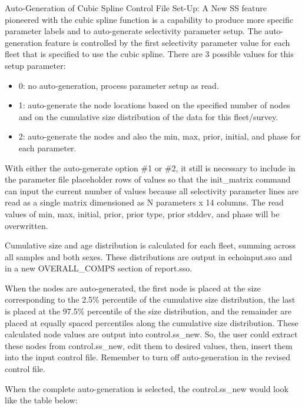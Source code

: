 	
Auto-Generation of Cubic Spline Control File Set-Up: A New SS feature pioneered with the cubic spline function is a capability to produce more specific parameter labels and to auto-generate selectivity parameter setup.  The auto-generation feature is controlled by the first selectivity parameter value for each fleet that is specified to use the cubic spline.  There are 3 possible values for this setup parameter:
	\begin{itemize}
		\item 0: no auto-generation, process parameter setup as read.
		\item 1: auto-generate the node locations based on the specified number of nodes and on the cumulative size distribution of the data for this fleet/survey.
		\item 2: auto-generate the nodes and also the min, max, prior, initial, and phase for each parameter.  
	\end{itemize}
	
With either the auto-generate option \#1 or \#2, it still is necessary to include in the parameter file placeholder rows of values so that the init\_matrix command can input the current number of values because all selectivity parameter lines are read as a single matrix dimensioned as N parameters x 14 columns.  The read values of min, max, initial, prior, prior type, prior stddev, and phase will be overwritten.
	
Cumulative size and age distribution is calculated for each fleet, summing across all samples and both sexes. These distributions are output in echoinput.sso and in a new OVERALL\_COMPS section of report.sso.
	
When the nodes are auto-generated, the first node is placed at the size corresponding to the 2.5\% percentile of the cumulative size distribution, the last is placed at the 97.5\% percentile of the size distribution, and the remainder are placed at equally spaced percentiles along the cumulative size distribution.  These calculated node values are output into control.ss\_new.  So, the user could extract these nodes from control.ss\_new, edit them to desired values, then, insert them into the input control file.  Remember to turn off auto-generation in the revised control file.
	
When the complete auto-generation is selected, the control.ss\_new would look like the table below:	

